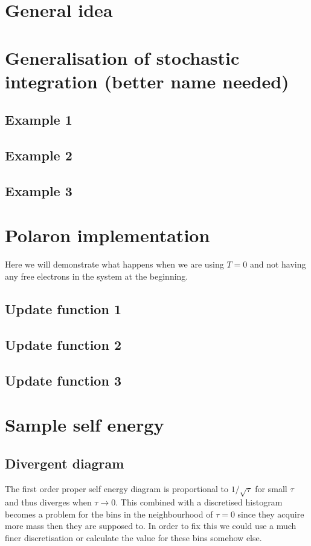 \documentclass[12pt]{report}
\newcommand{\todo}[1]{\textcolor{todo}{#1}}
\begin{document}
\section{General idea}

\section{Generalisation of stochastic integration (better name needed)}

\subsection{Example 1}
\subsection{Example 2}
\subsection{Example 3}

\section{Polaron implementation}

\todo{Here we will demonstrate what happens when we are using $ T = 0 $ and not having any free electrons in the system at the beginning.}

\subsection{Update function 1}
\subsection{Update function 2}
\subsection{Update function 3}

\section{Sample self energy}

\subsection{Divergent diagram}

The first order proper self energy diagram is proportional to $ 1/\sqrt{\tau} $ for small $ \tau $ and thus diverges when $ \tau \rightarrow 0 $. This combined with a discretised histogram becomes a problem for the bins in the neighbourhood of $ \tau = 0 $ since they acquire more mass then they are supposed to. In order to fix this we could use a much finer discretisation or calculate the value for these bins somehow else.
\end{document}
